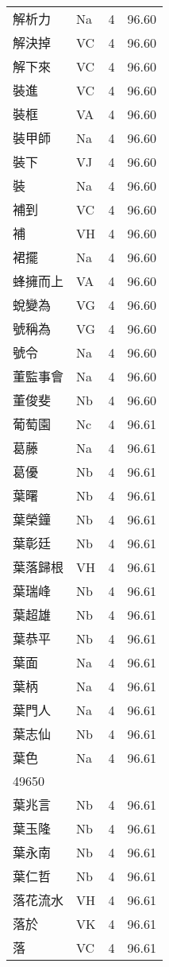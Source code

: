 \documentclass[twocolumn]{book}
\begin{document}
\begin{supertabular}{llrr}
解析力 & Na & 4 &  96.60\\
解決掉 & VC & 4 &  96.60\\
解下來 & VC & 4 &  96.60\\
裝進 & VC & 4 &  96.60\\
裝框 & VA & 4 &  96.60\\
裝甲師 & Na & 4 &  96.60\\
裝下 & VJ & 4 &  96.60\\
裝 & Na & 4 &  96.60\\
補到 & VC & 4 &  96.60\\
補 & VH & 4 &  96.60\\
裙擺 & Na & 4 &  96.60\\
蜂擁而上 & VA & 4 &  96.60\\
蛻變為 & VG & 4 &  96.60\\
號稱為 & VG & 4 &  96.60\\
號令 & Na & 4 &  96.60\\
董監事會 & Na & 4 &  96.60\\
董俊斐 & Nb & 4 &  96.60\\
葡萄園 & Nc & 4 &  96.61\\
葛藤 & Na & 4 &  96.61\\
葛優 & Nb & 4 &  96.61\\
葉曙 & Nb & 4 &  96.61\\
葉榮鐘 & Nb & 4 &  96.61\\
葉彰廷 & Nb & 4 &  96.61\\
葉落歸根 & VH & 4 &  96.61\\
葉瑞峰 & Nb & 4 &  96.61\\
葉超雄 & Nb & 4 &  96.61\\
葉恭平 & Nb & 4 &  96.61\\
葉面 & Na & 4 &  96.61\\
葉柄 & Na & 4 &  96.61\\
葉門人 & Na & 4 &  96.61\\
葉志仙 & Nb & 4 &  96.61\\
葉色 & Na & 4 &  96.61\\
49650\\
葉兆言 & Nb & 4 &  96.61\\
葉玉隆 & Nb & 4 &  96.61\\
葉永南 & Nb & 4 &  96.61\\
葉仁哲 & Nb & 4 &  96.61\\
落花流水 & VH & 4 &  96.61\\
落於 & VK & 4 &  96.61\\
落 & VC & 4 &  96.61\\

\end{supertabular}
\end{document}

